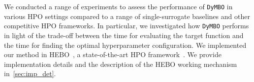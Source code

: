 We conducted a range of experiments to assess the performance of \texttt{DyMBO} in various HPO settings compared to a range of single-surrogate baselines and other competitive HPO frameworks.
In particular, we investigated how \texttt{DyMBO} performs in light of the trade-off between the time for evaluating the target function and the time for finding the optimal hyperparameter configuration.
We implemented our method in HEBO~\citep{CowEtAl22}, a state-of-the-art HPO framework~\citep{EggEtAl21b}.
We provide implementation details and the description of the HEBO working mechanism in~\cref{sec:imp_det}.

